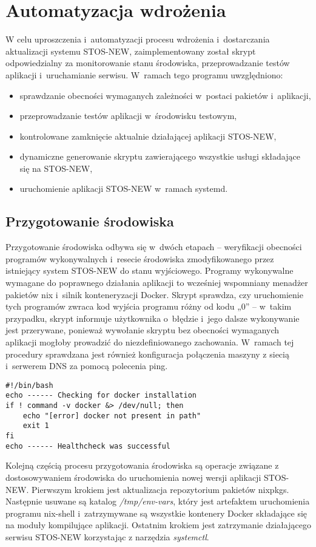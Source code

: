 
\section{Automatyzacja wdrożenia}
W celu uproszczenia i~automatyzacji procesu wdrożenia i~dostarczania aktualizacji systemu STOS-NEW, zaimplementowany został skrypt odpowiedzialny za monitorowanie stanu środowiska, przeprowadzanie testów aplikacji i~uruchamianie serwisu. W~ramach tego programu uwzględniono:
\begin{itemize}
	\item sprawdzanie obecności wymaganych zależności w~postaci pakietów i~aplikacji,
	\item przeprowadzanie testów aplikacji w~środowisku testowym,
	\item kontrolowane zamknięcie aktualnie działającej aplikacji STOS-NEW,
	\item dynamiczne generowanie skryptu zawierającego wszystkie usługi składające się na STOS-NEW,
	\item uruchomienie aplikacji STOS-NEW w~ramach systemd.
\end{itemize}
\subsection{Przygotowanie środowiska}
Przygotowanie środowiska odbywa się w~dwóch etapach -- weryfikacji obecności programów wykonywalnych i~resecie środowiska zmodyfikowanego przez istniejący system STOS-NEW do stanu wyjściowego. 
\newline \noindent Programy wykonywalne wymagane do poprawnego działania aplikacji to wcześniej wspomniany menadżer pakietów nix i~silnik konteneryzacji Docker. Skrypt sprawdza, czy uruchomienie tych programów zwraca kod wyjścia programu różny od kodu „0” -- w~takim przypadku, skrypt informuje użytkownika o~błędzie i~jego dalsze wykonywanie jest przerywane, ponieważ wywołanie skryptu bez obecności wymaganych aplikacji mogłoby prowadzić do niezdefiniowanego zachowania. W~ramach tej procedury sprawdzana jest również konfiguracja połączenia maszyny z siecią i~serwerem DNS za pomocą polecenia ping.
\lstset{style=shell}
\begin{lstlisting}[caption = {Przykład weryfikacji obecności instalacji programu „docker” w~systemie.}]
#!/bin/bash
echo ------ Checking for docker installation 
if ! command -v docker &> /dev/null; then
    echo "[error] docker not present in path"
    exit 1
fi
echo ------ Healthcheck was successful 
\end{lstlisting}
\noindent Kolejną częścią procesu przygotowania środowiska są operacje związane z dostosowywaniem środowiska do uruchomienia nowej wersji aplikacji STOS-NEW. Pierwszym krokiem jest aktualizacja repozytorium pakietów nixpkgs. Następnie usuwane są katalog \textit{/tmp/env-vars}, który jest artefaktem uruchomienia programu nix-shell i~zatrzymywane są wszystkie kontenery Docker składające się na moduły kompilujące aplikacji. Ostatnim krokiem jest zatrzymanie działającego serwisu STOS-NEW korzystając z narzędzia \textit{systemctl}.
